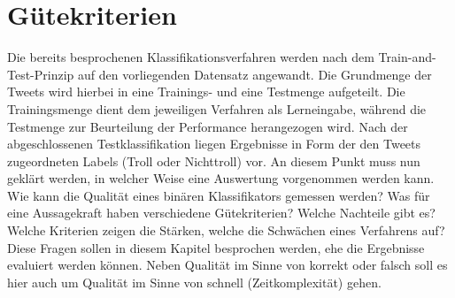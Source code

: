 \section{Gütekriterien}\raggedbottom
Die bereits besprochenen Klassifikationsverfahren werden nach dem \glqq Train-and-Test\grqq-Prinzip auf den vorliegenden Datensatz angewandt. Die Grundmenge der Tweets wird hierbei in eine Trainings- und eine Testmenge aufgeteilt. Die Trainingsmenge dient dem jeweiligen Verfahren als Lerneingabe, während die Testmenge zur Beurteilung der Performance herangezogen wird. Nach der abgeschlossenen Testklassifikation liegen Ergebnisse in Form der den Tweets zugeordneten Labels (Troll oder Nichttroll) vor. An diesem Punkt muss nun geklärt werden, in welcher Weise eine Auswertung vorgenommen werden kann. Wie kann die Qualität eines binären Klassifikators gemessen werden? Was für eine Aussagekraft haben verschiedene Gütekriterien? Welche Nachteile gibt es? Welche Kriterien zeigen die Stärken, welche die Schwächen eines Verfahrens auf? Diese Fragen sollen in diesem Kapitel besprochen werden, ehe die Ergebnisse evaluiert werden können. Neben Qualität im Sinne von korrekt oder falsch soll es hier auch um Qualität im Sinne von schnell (Zeitkomplexität) gehen. 
